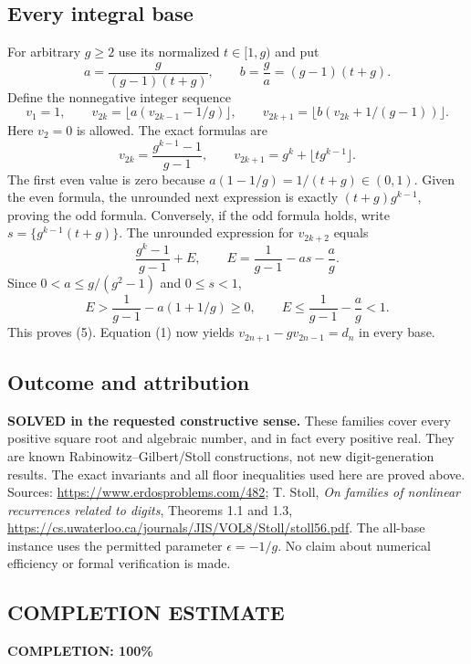 \subsection*{Every integral base}
For arbitrary $g\ge2$ use its normalized $t\in[1,g)$ and put
\[a=\frac{g}{(g-1)(t+g)},\qquad b=\frac ga=(g-1)(t+g).
\]
Define the nonnegative integer sequence
\[v_1=1,\qquad v_{2k}=\lfloor a(v_{2k-1}-1/g)\rfloor,
\qquad v_{2k+1}=\lfloor b(v_{2k}+1/(g-1))\rfloor.\tag{4}\]
Here $v_2=0$ is allowed. The exact formulas are
\[v_{2k}=\frac{g^{k-1}-1}{g-1},\qquad
v_{2k+1}=g^k+\lfloor tg^{k-1}\rfloor.\tag{5}\]
The first even value is zero because $a(1-1/g)=1/(t+g)\in(0,1)$. Given the even formula, the unrounded next expression is exactly $(t+g)g^{k-1}$, proving the odd formula. Conversely, if the odd formula holds, write $s=\{g^{k-1}(t+g)\}$. The unrounded expression for $v_{2k+2}$ equals
\[\frac{g^k-1}{g-1}+E,\qquad
E=\frac1{g-1}-as-\frac ag.
\]
Since $0<a\le g/(g^2-1)$ and $0\le s<1$,
\[E>\frac1{g-1}-a(1+1/g)\ge0,
\qquad E\le\frac1{g-1}-\frac ag<1.
\]
This proves (5). Equation (1) now yields $v_{2n+1}-gv_{2n-1}=d_n$ in every base.

\subsection*{Outcome and attribution}
\textbf{SOLVED in the requested constructive sense.} These families cover every positive square root and algebraic number, and in fact every positive real. They are known Rabinowitz--Gilbert/Stoll constructions, not new digit-generation results. The exact invariants and all floor inequalities used here are proved above.
Sources: \url{https://www.erdosproblems.com/482}; T. Stoll, \emph{On families of nonlinear recurrences related to digits}, Theorems 1.1 and 1.3, \url{https://cs.uwaterloo.ca/journals/JIS/VOL8/Stoll/stoll56.pdf}. The all-base instance uses the permitted parameter $\epsilon=-1/g$. No claim about numerical efficiency or formal verification is made.

\subsection*{COMPLETION ESTIMATE}
\textbf{COMPLETION: 100\%}
